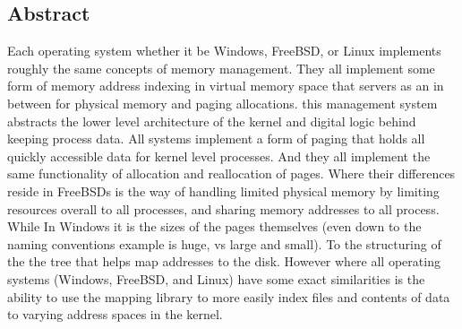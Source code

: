 \subsection{Abstract}
Each operating system whether it be Windows, FreeBSD, or Linux implements roughly the same concepts of memory management. They all implement some form of memory address indexing in virtual memory space that servers as an in between for physical memory and paging allocations. this management system abstracts the lower level architecture of the kernel and digital logic behind keeping process data. All systems implement a form of paging that holds all quickly accessible data for kernel level processes. And they all implement the same functionality of allocation and reallocation of pages. Where their differences reside in FreeBSDs is the way of handling limited physical memory by limiting resources overall to all processes, and sharing memory addresses to all process. While In Windows it is the sizes of the pages themselves (even down to the naming conventions example is huge, vs large and small). To the structuring of the the tree that helps map addresses to the disk. However where all operating systems (Windows, FreeBSD, and Linux) have some exact similarities is the ability to use the mapping library to more easily index files and contents of data to varying address spaces in the kernel.
